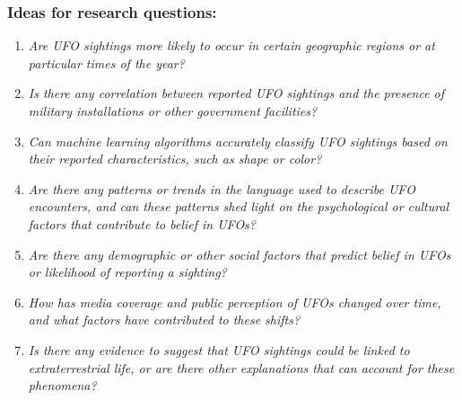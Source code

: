 \documentclass[
]{article}
\begin{document}
\hypertarget{ideas-for-research-questions}{%
\subsubsection{Ideas for research
questions:}\label{ideas-for-research-questions}}

\begin{enumerate}
\def\labelenumi{\arabic{enumi}.}
\item
  \emph{Are UFO sightings more likely to occur in certain geographic
  regions or at particular times of the year?}
\item
  \emph{Is there any correlation between reported UFO sightings and the
  presence of military installations or other government facilities?}
\item
  \emph{Can machine learning algorithms accurately classify UFO
  sightings based on their reported characteristics, such as shape or
  color?}
\item
  \emph{Are there any patterns or trends in the language used to
  describe UFO encounters, and can these patterns shed light on the
  psychological or cultural factors that contribute to belief in UFOs?}
\item
  \emph{Are there any demographic or other social factors that predict
  belief in UFOs or likelihood of reporting a sighting?}
\item
  \emph{How has media coverage and public perception of UFOs changed
  over time, and what factors have contributed to these shifts?}
\item
  \emph{Is there any evidence to suggest that UFO sightings could be
  linked to extraterrestrial life, or are there other explanations that
  can account for these phenomena?}
\end{enumerate}
\end{document}
